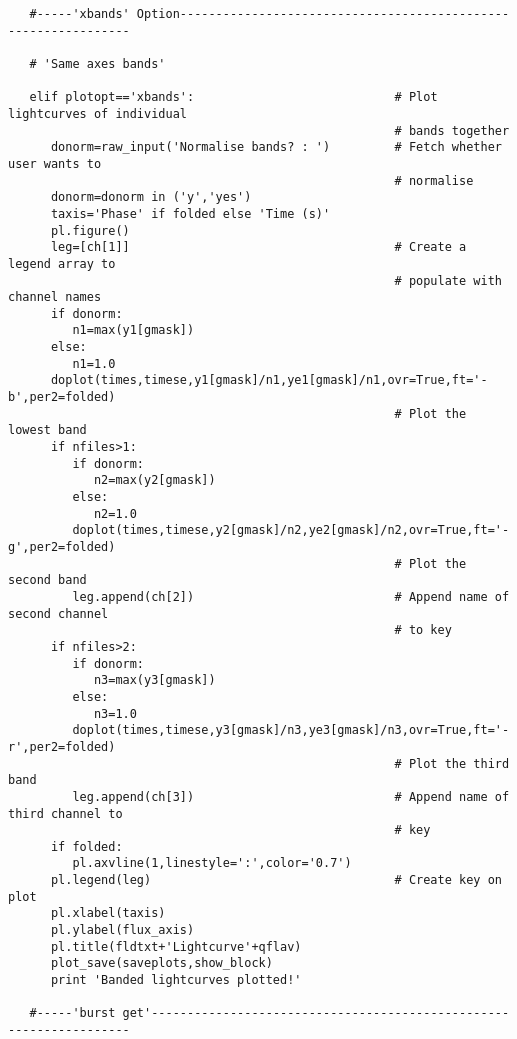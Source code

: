 \begin{verbatim}
   #-----'xbands' Option---------------------------------------------------------------

   # 'Same axes bands'

   elif plotopt=='xbands':                            # Plot lightcurves of individual
                                                      # bands together
      donorm=raw_input('Normalise bands? : ')         # Fetch whether user wants to
                                                      # normalise
      donorm=donorm in ('y','yes') 
      taxis='Phase' if folded else 'Time (s)'
      pl.figure()
      leg=[ch[1]]                                     # Create a legend array to
                                                      # populate with channel names
      if donorm:
         n1=max(y1[gmask])
      else:
         n1=1.0
      doplot(times,timese,y1[gmask]/n1,ye1[gmask]/n1,ovr=True,ft='-b',per2=folded)
                                                      # Plot the lowest band
      if nfiles>1:
         if donorm:
            n2=max(y2[gmask])
         else:
            n2=1.0
         doplot(times,timese,y2[gmask]/n2,ye2[gmask]/n2,ovr=True,ft='-g',per2=folded)
                                                      # Plot the second band
         leg.append(ch[2])                            # Append name of second channel
                                                      # to key
      if nfiles>2:
         if donorm:
            n3=max(y3[gmask])
         else:
            n3=1.0
         doplot(times,timese,y3[gmask]/n3,ye3[gmask]/n3,ovr=True,ft='-r',per2=folded)
                                                      # Plot the third band
         leg.append(ch[3])                            # Append name of third channel to
                                                      # key
      if folded:
         pl.axvline(1,linestyle=':',color='0.7')
      pl.legend(leg)                                  # Create key on plot
      pl.xlabel(taxis)
      pl.ylabel(flux_axis)
      pl.title(fldtxt+'Lightcurve'+qflav)
      plot_save(saveplots,show_block)
      print 'Banded lightcurves plotted!'

   #-----'burst get'-------------------------------------------------------------------


\end{verbatim}
